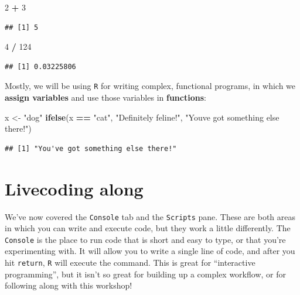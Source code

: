 \documentclass[
]{book}
\newenvironment{Shaded}{\begin{snugshade}}{\end{snugshade}}
\newcommand{\DecValTok}[1]{\textcolor[rgb]{0.00,0.00,0.81}{#1}}
\newcommand{\FunctionTok}[1]{\textcolor[rgb]{0.13,0.29,0.53}{\textbf{#1}}}
\newcommand{\NormalTok}[1]{#1}
\newcommand{\OtherTok}[1]{\textcolor[rgb]{0.56,0.35,0.01}{#1}}
\newcommand{\SpecialCharTok}[1]{\textcolor[rgb]{0.81,0.36,0.00}{\textbf{#1}}}
\newcommand{\StringTok}[1]{\textcolor[rgb]{0.31,0.60,0.02}{#1}}
\begin{document}
\begin{Shaded}
\begin{Highlighting}[]
\DecValTok{2} \SpecialCharTok{+} \DecValTok{3}
\end{Highlighting}
\end{Shaded}

\begin{verbatim}
## [1] 5
\end{verbatim}

\begin{Shaded}
\begin{Highlighting}[]
\DecValTok{4} \SpecialCharTok{/} \DecValTok{124}
\end{Highlighting}
\end{Shaded}

\begin{verbatim}
## [1] 0.03225806
\end{verbatim}

Mostly, we will be using \texttt{R} for writing complex, functional programs, in which we \textbf{assign variables} and use those variables in \textbf{functions}:

\begin{Shaded}
\begin{Highlighting}[]
\NormalTok{x }\OtherTok{\textless{}{-}} \StringTok{"dog"}
\FunctionTok{ifelse}\NormalTok{(x }\SpecialCharTok{==} \StringTok{"cat"}\NormalTok{, }\StringTok{"Definitely feline!"}\NormalTok{, }\StringTok{"You\textquotesingle{}ve got something else there!"}\NormalTok{)}
\end{Highlighting}
\end{Shaded}

\begin{verbatim}
## [1] "You've got something else there!"
\end{verbatim}

\hypertarget{livecoding-along}{%
\section{Livecoding along}\label{livecoding-along}}

We've now covered the \texttt{Console} tab and the \texttt{Scripts} pane. These are both areas in which you can write and execute code, but they work a little differently. The \texttt{Console} is the place to run code that is short and easy to type, or that you're experimenting with. It will allow you to write a single line of code, and after you hit \texttt{return}, \texttt{R} will execute the command. This is great for ``interactive programming'', but it isn't so great for building up a complex workflow, or for following along with this workshop!
\end{document}
